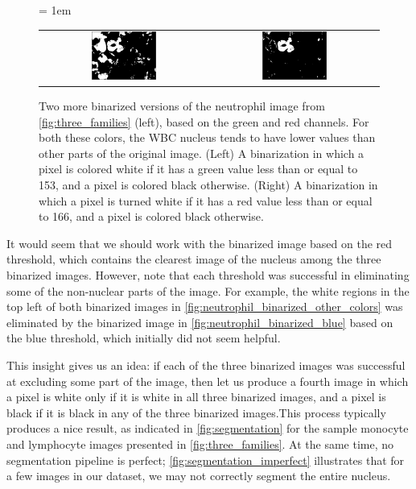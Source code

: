 \begin{figure}[h]
\centering
 \tabcolsep = 1em
\mySfFamily
\begin{tabular}{c c}
\includegraphics[width = 0.4\textwidth]{../images/neutrophil_binarized_green.png} & \includegraphics[width = 0.4\textwidth]{../images/neutrophil_binarized_red.png}
\end{tabular}
\caption{Two more binarized versions of the neutrophil image from \autoref{fig:three_families} (left), based on the green and red channels. For both these colors, the WBC nucleus tends to have lower values than other parts of the original image. (Left) A binarization in which a pixel is colored white if it has a green value less than or equal to 153, and a pixel is colored black otherwise. (Right) A binarization in which a pixel is turned white if it has a red value less than or equal to 166, and a pixel is colored black otherwise.}
\label{fig:neutrophil_binarized_other_colors}
\end{figure}

It would seem that we should work with the binarized image based on the red threshold, which contains the clearest image of the nucleus among the three binarized images. However, note that each threshold was successful in eliminating some of the non-nuclear parts of the image. For example, the white regions in the top left of both binarized images in \autoref{fig:neutrophil_binarized_other_colors} was eliminated by the binarized image in \autoref{fig:neutrophil_binarized_blue} based on the blue threshold, which initially did not seem helpful.

This insight gives us an idea: if each of the three binarized images was successful at excluding some part of the image, then let us produce a fourth image in which a pixel is white only if it is white in all three binarized images, and a pixel is black if it is black in any of the three binarized images. This process typically produces a nice result, as indicated in \autoref{fig:segmentation} for the sample monocyte and lymphocyte images presented in \autoref{fig:three_families}. At the same time, no segmentation pipeline is perfect; \autoref{fig:segmentation_imperfect} illustrates that for a few images in our dataset, we may not correctly segment the entire nucleus. \\

